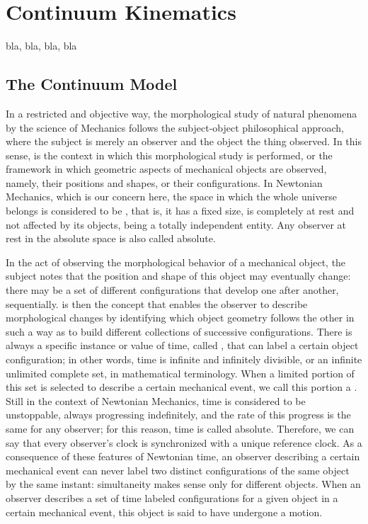 \chapter{Continuum Kinematics}

bla, bla, bla, bla


\section{The Continuum Model}


In a restricted and objective way, the morphological study of natural phenomena by the science of Mechanics follows the subject-object philosophical approach, where the subject is merely an observer and the object the thing observed. In this sense,  is the context in which this morphological study is performed, or the framework in which geometric aspects of mechanical objects are observed, namely, their positions and shapes, or their configurations. In Newtonian Mechanics, which is our concern here, the space in which the whole universe belongs is considered to be , that is, it has a fixed size, is completely at rest and not affected by its objects, being a totally independent entity. Any observer at rest in the absolute space is also called absolute.     

In the act of observing the morphological behavior of a mechanical object, the subject notes that the position and shape of this object may eventually change: there may be a set of different configurations that develop one after another, sequentially.  is then the concept that enables the observer to describe morphological changes by identifying which object geometry follows the other in such a way as to build different collections of successive configurations. There is always a specific instance or value of time, called , that can label a certain object configuration; in other words, time is infinite and infinitely divisible, or an infinite unlimited complete set, in mathematical terminology. When a limited portion of this set is selected to describe a certain mechanical event, we call this portion a . Still in the context of Newtonian Mechanics, time is considered to be unstoppable, always progressing indefinitely, and the rate of this progress is the same for any observer; for this reason, time is called absolute. Therefore, we can say that every observer's clock is synchronized with a unique reference clock. As a consequence of these features of Newtonian time, an observer describing a certain mechanical event can never label two distinct configurations of the same object by the same instant: simultaneity makes sense only for different objects. When an observer describes a set of time labeled configurations for a given object in a certain mechanical event, this object is said to have undergone a motion.









